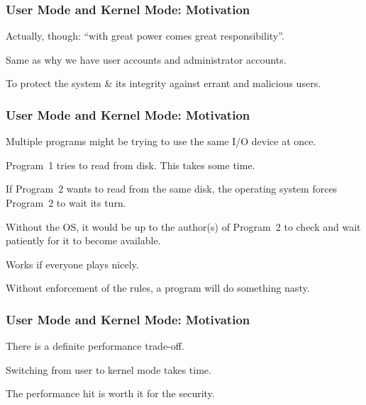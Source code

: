 \begin{frame}
	\frametitle{User Mode and Kernel Mode: Motivation}


	Actually, though: ``with great power comes great responsibility''.


	Same as why we have user accounts and administrator accounts.

	To protect the system \& its integrity against errant and malicious users.


\end{frame}

\begin{frame}
	\frametitle{User Mode and Kernel Mode: Motivation}

	Multiple programs might be trying to use the same I/O device at once.

	Program~1 tries to read from disk. This takes some time.

	If Program~2 wants to read from the same disk, the operating system forces Program~2 to wait its turn.

	Without the OS, it would be up to the author(s) of Program~2 to check and wait patiently for it to become available.

	Works if everyone plays nicely.

	Without enforcement of the rules, a program will do something nasty.

\end{frame}

\begin{frame}
	\frametitle{User Mode and Kernel Mode: Motivation}

	There is a definite performance trade-off.

	Switching from user to kernel mode takes time.

	The performance hit is worth it for the security.

\end{frame}

